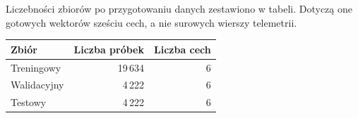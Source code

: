\documentclass[12pt,a4paper]{article}
\begin{document}
Liczebności zbiorów po przygotowaniu danych zestawiono w tabeli. Dotyczą one gotowych wektorów sześciu cech, a nie surowych wierszy telemetrii.
\begin{center}
	\begin{tabular}{lrr}
		\hline
		Zbiór & Liczba próbek & Liczba cech \\
		\hline
		Treningowy & 19\,634 & 6 \\
		Walidacyjny & 4\,222 & 6 \\
		Testowy & 4\,222 & 6 \\
		\hline
	\end{tabular}
\end{center}

\clearpage
\begingroup
\small


\endgroup
\end{document}
